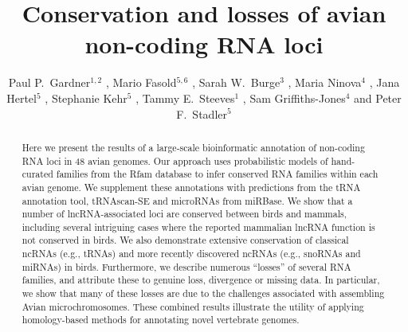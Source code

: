 \documentclass[10pt]{bmc_article}
\newenvironment{bmcformat}{\begin{raggedright}\baselineskip20pt\sloppy\setboolean{publ}{false}}{\end{raggedright}\baselineskip20pt\sloppy}
\begin{document}
\begin{bmcformat}

\title{Conservation and losses of avian non-coding RNA loci}

\author{
Paul P.\ Gardner\correspondingauthor$^{1,2}$
,
Mario Fasold$^{5,6}$
,
Sarah W.\ Burge$^3$
,
Maria Ninova$^4$
,
Jana Hertel$^5$
,
Stephanie Kehr$^5$
,
Tammy E.\ Steeves$^1$
,
Sam Griffiths-Jones$^4$
and
Peter F.\ Stadler\correspondingauthor$^5$
}
\address{
\iid(1) School of Biological Sciences, University of Canterbury, Private Bag 4800, Christchurch, New Zealand.
\iid(2) Biomolecular Interaction Centre, University of Canterbury, Private Bag 4800, Christchurch, New Zealand.
\iid(3) European Molecular Biology Laboratory, European Bioinformatics Institute, Hinxton, Cambridge, CB10 1SD, UK.
\iid(4) Faculty of Life Sciences, University of Manchester, Manchester, United Kingdom.
\iid(5) Bioinformatics Group, Department of Computer Science; and Interdisciplinary Center for Bioinformatics, University of Leipzig, H{\"a}rtelstrasse 16-18, D-04107 Leipzig, Germany.
\iid(6) ecSeq Bioinformatics, Brandvorwerkstr.43, D-04275 Leipzig, Germany.
}

\maketitle

\begin{abstract}
Here we present the results of a large-scale bioinformatic annotation
of non-coding RNA loci in 48 avian genomes. Our approach uses
probabilistic models of hand-curated families from the Rfam database
to infer conserved RNA families within each avian genome. We
supplement these annotations with predictions from the tRNA annotation
tool, tRNAscan-SE and microRNAs from miRBase.  We show that a number of
lncRNA-associated loci are conserved between birds and mammals,
including several intriguing cases where the reported mammalian lncRNA
function is not conserved in birds.  We also demonstrate extensive
conservation of classical ncRNAs (e.g., tRNAs) and more recently
discovered ncRNAs (e.g., snoRNAs and miRNAs) in birds. Furthermore, we
describe numerous ``losses'' of several RNA families, and attribute
these to genuine loss, divergence or missing data.  In particular, we
show that many of these losses are due to the challenges associated
with assembling Avian microchromosomes. These combined results illustrate the utility of
applying homology-based methods for annotating novel vertebrate
genomes.
\end{abstract}




\end{bmcformat}
\end{document}
